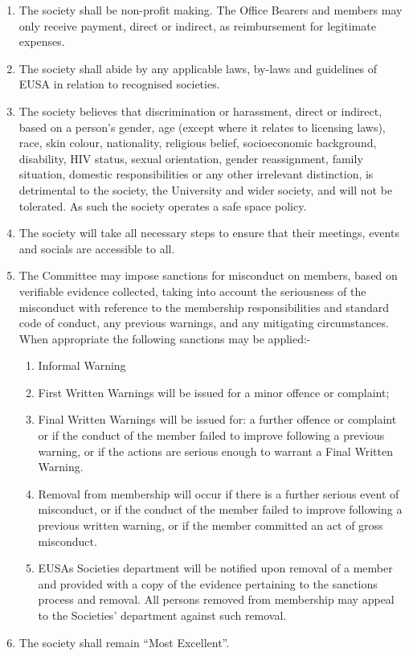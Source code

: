 \begin{enumerate}
  \item The society shall be non-profit making. The Office Bearers and members may only receive payment, direct or indirect, as reimbursement for legitimate expenses.

  \item The society shall abide by any applicable laws, by-laws and guidelines of EUSA in relation to recognised societies.

  \item The society believes that discrimination or harassment, direct or indirect,
    based on a person’s gender, age (except where it relates to licensing
    laws), race, skin colour, nationality, religious belief, socioeconomic background,
    disability, HIV status, sexual orientation, gender reassignment,
    family situation, domestic responsibilities or any other irrelevant distinction,
    is detrimental to the society, the University and wider society, and
    will not be tolerated. As such the society operates a safe space policy.

  \item The society will take all necessary steps to ensure that their meetings, events and socials are accessible to all.

  \item The Committee may impose sanctions for misconduct on members,
    based on verifiable evidence collected, taking into account the seriousness of the misconduct
    with reference to the membership responsibilities and standard code of conduct, any previous warnings,
    and any mitigating circumstances. When appropriate the following sanctions may be applied:-

    \begin{enumerate}
      \item Informal Warning
      \item First Written Warnings will be issued for a minor offence or complaint;
      \item Final Written Warnings will be issued for: a further offence or complaint or if the conduct of the member
        failed to improve following a previous warning, or if the actions are serious enough to warrant a
        Final Written Warning.
      \item Removal from membership will occur if there is a further serious event of misconduct, or if the conduct
        of the member failed to improve following a previous written warning, or if the member committed
        an act of gross misconduct.
      \item EUSA\textquotesingle s Societies department will be notified upon removal of a member and provided with a copy of
        the evidence pertaining to the sanctions process and removal. All persons removed from membership
        may appeal to the Societies' department against such removal.
    \end{enumerate}

  \item The society shall remain ``Most Excellent''.

\end{enumerate}
